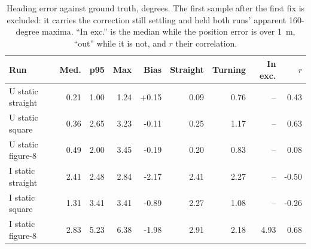 \begin{table}[htbp]
\centering\small
\caption{Heading error against ground truth, degrees. The first sample after the first fix is excluded: it carries the correction still settling and held both runs' apparent 160-degree maxima. ``In exc.'' is the median while the position error is over \SI{1}{\metre}, ``out'' while it is not, and $r$ their correlation.}
\label{tab:insight4nav-rotation}
\begin{tabular}{lrrrrrrrr}
\toprule
Run & Med. & p95 & Max & Bias & Straight & Turning & In exc. & $r$ \\
\midrule
U static straight & 0.21 & 1.00 & 1.24 & +0.15 & 0.09 & 0.76 & -- & 0.43 \\
U static square & 0.36 & 2.65 & 3.23 & -0.11 & 0.25 & 1.17 & -- & 0.63 \\
U static figure-8 & 0.49 & 2.00 & 3.45 & -0.19 & 0.20 & 0.83 & -- & 0.08 \\
I static straight & 2.41 & 2.48 & 2.84 & -2.17 & 2.41 & 2.27 & -- & -0.50 \\
I static square & 1.31 & 3.41 & 3.41 & -0.89 & 2.27 & 1.08 & -- & -0.26 \\
I static figure-8 & 2.83 & 5.23 & 6.38 & -1.98 & 2.91 & 2.18 & 4.93 & 0.68 \\
\bottomrule
\end{tabular}
\end{table}
